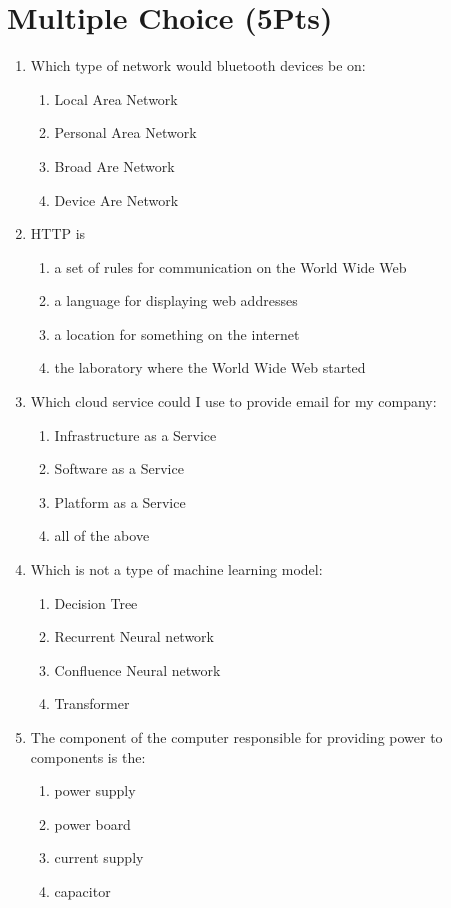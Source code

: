 \documentclass{article}
\begin{document}
\pagestyle{fancy}
\section{Multiple Choice (5Pts)}
\begin{enumerate}
    \item Which type of network would bluetooth devices be on:
    \begin{enumerate}
        \item Local Area Network
        \item Personal Area Network
        \item Broad Are Network
        \item Device Are Network
    \end{enumerate}
    \item HTTP is
    \begin{enumerate}
        \item a set of rules for communication on the World Wide Web
        \item a language for displaying web addresses
        \item a location for something on the internet
        \item the laboratory where the World Wide Web started
    \end{enumerate}
    \item Which cloud service could I use to provide email for my company:
    \begin{enumerate}
        \item Infrastructure as a Service
        \item Software as a Service
        \item Platform as a Service
        \item all of the above
    \end{enumerate}
    \item Which is not a type of machine learning model:
    \begin{enumerate}
        \item Decision Tree
        \item Recurrent Neural network
        \item Confluence Neural network
        \item Transformer
    \end{enumerate} 
    \item The component of the computer responsible for providing power to components is the:
    \begin{enumerate}
        \item power supply
        \item power board
        \item current supply
        \item capacitor
    \end{enumerate} 
\end{enumerate}
\end{document}
